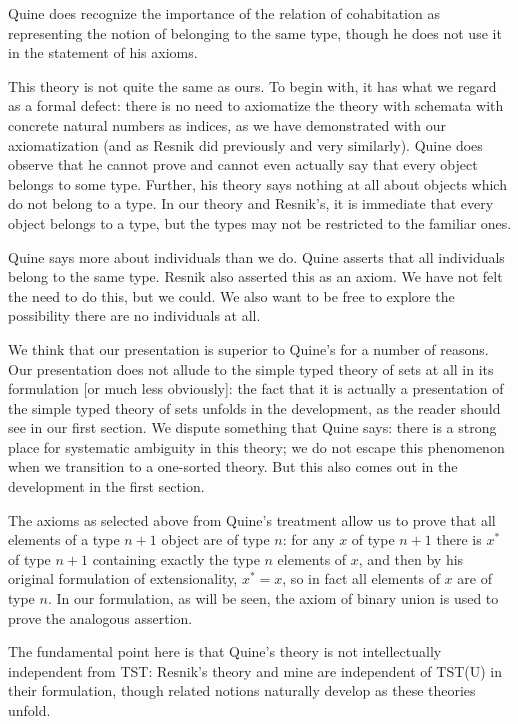 \documentclass[12pt]{article}
\begin{document}
Quine does recognize the importance of the relation of cohabitation as representing the notion of belonging to the same type, though he does not use it in the statement of his axioms.

This theory is not quite the same as ours.  To begin with, it has what we regard as a formal defect:  there is no need to axiomatize the theory with schemata with concrete natural numbers as indices, as we have demonstrated with our axiomatization (and as Resnik did previously and very similarly).  Quine does observe that he cannot prove and cannot even actually say that every object belongs to some type.  Further, his theory says nothing at all about objects which do not belong to a type. In our theory and Resnik's, it is immediate that every object belongs to a type, but the types may not be restricted to the familiar ones.

Quine says more about individuals than we do.  Quine asserts that all individuals belong to the same type.  Resnik also asserted this as an axiom.  We have not felt the need to do this, but we could.  We also want to be free to explore the possibility there are no individuals at all.

We think that our presentation is superior to Quine's for a number of reasons.  Our presentation does not allude to the simple typed theory of sets at all in its formulation [or much less obviously]:  the fact that it is actually a presentation of the simple typed theory of sets unfolds in the development, as the reader should see in our first section.  We dispute something that Quine says:  there is a strong place for systematic ambiguity in this theory; we do not escape this phenomenon when we transition to a one-sorted theory.  But this also comes out in the development in the first section.

The axioms as selected above from Quine's treatment allow us to prove that
all elements of a type $n+1$ object are of type $n$:  for any $x$ of type $n+1$ there
is $x^*$ of type $n+1$ containing exactly the type $n$ elements of $x$, and then by his original formulation of extensionality, $x^*=x$, so in fact all elements of $x$ are of type $n$.  In our formulation, as will be seen, the axiom of binary union is used to prove the analogous assertion.

The fundamental point here is that Quine's theory is not intellectually independent from TST:  Resnik's theory and mine are independent of TST(U) in their formulation, though related notions naturally develop as these theories unfold.
\end{document}
